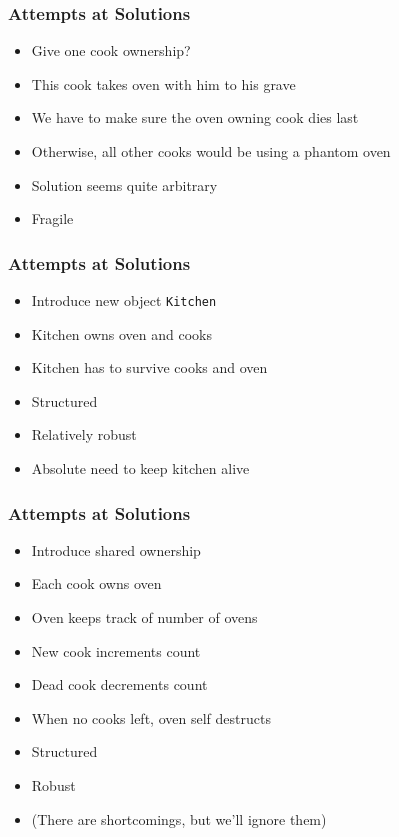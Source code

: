 \begin{frame}
  \frametitle{Attempts at Solutions}
  \begin{itemize}
    \item Give one cook ownership?
    \item This cook takes oven with him to his grave
    \item We have to make sure the oven owning cook dies last
    \item Otherwise, all other cooks would be using a phantom oven
  \end{itemize}
  \vskip5mm
  \begin{itemize}
    \item Solution seems quite arbitrary
    \item Fragile
  \end{itemize}
\end{frame}

\begin{frame}
  \frametitle{Attempts at Solutions}
  \begin{itemize}
    \item Introduce new object {\tt Kitchen}
    \item Kitchen owns oven and cooks
    \item Kitchen has to survive cooks and oven
  \end{itemize}
  \vskip5mm
  \begin{itemize}
    \item Structured
    \item Relatively robust
    \item Absolute need to keep kitchen alive
  \end{itemize}
\end{frame}

\begin{frame}
  \frametitle{Attempts at Solutions}
  \begin{itemize}
    \item Introduce shared ownership
    \item Each cook owns oven
    \item Oven keeps track of number of ovens
    \item New cook increments count
    \item Dead cook decrements count
    \item When no cooks left, oven self destructs
  \end{itemize}
  \vskip5mm
  \begin{itemize}
    \item Structured
    \item Robust
    \item (There are shortcomings, but we'll ignore them)
  \end{itemize}
\end{frame}

